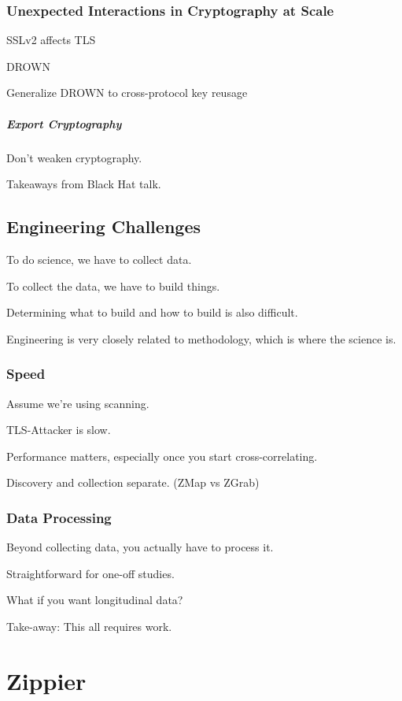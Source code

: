 \subsection{Unexpected Interactions in Cryptography at Scale}

SSLv2 affects TLS

DROWN

Generalize DROWN to cross-protocol key reusage

\paragraph{Export Cryptography}
Don't weaken cryptography.

Takeaways from Black Hat talk.

\section{Engineering Challenges}

To do science, we have to collect data.

To collect the data, we have to build things.

Determining what to build and how to build is also difficult.

Engineering is very closely related to methodology, which is where the science is.

\subsection{Speed}

Assume we're using scanning.

TLS-Attacker is slow.

Performance matters, especially once you start cross-correlating.

Discovery and collection separate. (ZMap vs ZGrab)

\subsection{Data Processing}

Beyond collecting data, you actually have to process it.

Straightforward for one-off studies.

What if you want longitudinal data?

Take-away: This all requires work.


\chapter{Zippier}

